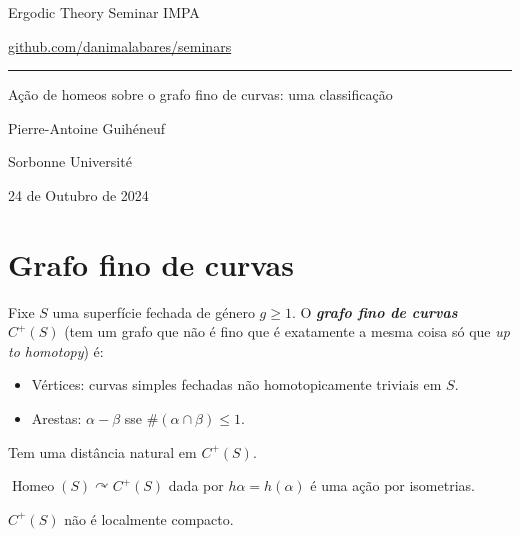 \renewcommand*{\contentsname}{}  



\begin{minipage}{\textwidth}
	\begin{minipage}{1\textwidth}
		Ergodic Theory Seminar \hfill IMPA
		
		{\small\hfill\href{https://github.com/danimalabares/seminars}{github.com/danimalabares/seminars}}
	\end{minipage}
\end{minipage}\vspace{.2cm}\hrule

\vspace{10pt}

{\Huge Ação de homeos sobre o grafo fino de curvas: uma classificação}

\vspace{1em}
\hfill{\Large Pierre-Antoine Guihéneuf}

\hfill{\large Sorbonne Université}

\hfill{\large 24 de Outubro de 2024}

\vspace{-2em}
\tableofcontents

\section{Grafo fino de curvas }

Fixe $S$ uma superfície fechada de género $g \geq 1$. O \textit{\textbf{grafo fino de curvas}} $C^+(S)$ (tem um grafo que não é fino que é exatamente a mesma coisa só que \textit{up to homotopy}) é:
\begin{itemize}
\item Vértices: curvas simples fechadas não homotopicamente triviais em $S$.
\item Arestas: $\alpha-\beta$ sse $\#(\alpha\cap \beta)\leq 1$.
\end{itemize}
Tem uma distância natural em $C^+(S)$.

\begin{remark}\leavevmode
$\operatorname{Homeo}(S)\curvearrowright C^+(S)$ dada por $h\alpha=h(\alpha)$ é uma ação por isometrias.
\end{remark}

\begin{remark}\leavevmode
$C^+(S)$ não é localmente compacto.
\end{remark}

